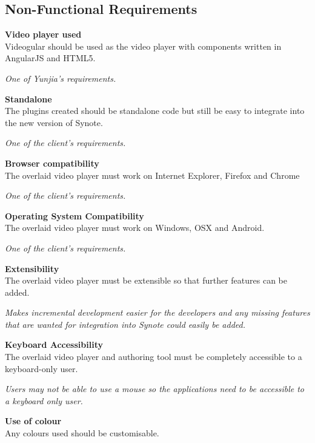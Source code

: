 \subsection{Non-Functional Requirements}
\begin{requirement}[label=\textbf{N\arabic*}]
\item \textbf{Video player used} \label{Req:Video player used} \hfill \\ Videogular should be used as the video player with components written in AngularJS and HTML5.

\textit{One of Yunjia's requirements.}
\item \textbf{Standalone} \label{Req:Standalone} \hfill \\ The plugins created should be standalone code but still be easy to integrate into the new version of Synote.

\textit{One of the client's requirements.}
\item \textbf{Browser compatibility} \label{Req:Browser compatibility} \hfill \\ The overlaid video player must work on Internet Explorer, Firefox and Chrome 

\textit{One of the client's requirements.}
\item \textbf{Operating System Compatibility} \label{Req:OS compatibility} \hfill \\ The overlaid video player must work on Windows, OSX and Android.

\textit{One of the client's requirements.}
\item \textbf{Extensibility} \label{Req:Extensibility} \hfill \\ The overlaid video player must be extensible so that further features can be added. 

\textit{Makes incremental development easier for the developers and any missing features that are wanted for integration into Synote could easily be added.}
\item \textbf{Keyboard Accessibility}\label{Req:Keyboard accessibility} \hfill \\ The overlaid video player and authoring tool must be completely accessible to a keyboard-only user.

\textit{Users may not be able to use a mouse so the applications need to be accessible to a keyboard only user.}
\item \textbf{Use of colour}\label{Req:Use of colour} \hfill \\ Any colours used should be customisable.


\end{requirement}
